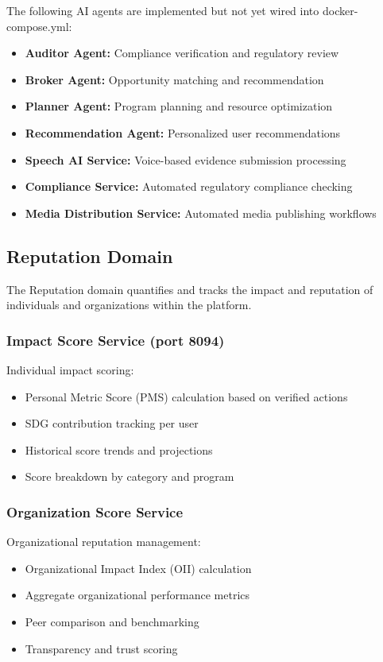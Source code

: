 The following AI agents are implemented but not yet wired into docker-compose.yml:
\begin{itemize}
  \item \textbf{Auditor Agent:} Compliance verification and regulatory review
  \item \textbf{Broker Agent:} Opportunity matching and recommendation
  \item \textbf{Planner Agent:} Program planning and resource optimization
  \item \textbf{Recommendation Agent:} Personalized user recommendations
  \item \textbf{Speech AI Service:} Voice-based evidence submission processing
  \item \textbf{Compliance Service:} Automated regulatory compliance checking
  \item \textbf{Media Distribution Service:} Automated media publishing workflows
\end{itemize}

\subsection{Reputation Domain}

The Reputation domain quantifies and tracks the impact and reputation of individuals and organizations within the platform.

\subsubsection{Impact Score Service (port 8094)}

Individual impact scoring:
\begin{itemize}
  \item Personal Metric Score (PMS) calculation based on verified actions
  \item SDG contribution tracking per user
  \item Historical score trends and projections
  \item Score breakdown by category and program
\end{itemize}

\subsubsection{Organization Score Service}

Organizational reputation management:
\begin{itemize}
  \item Organizational Impact Index (OII) calculation
  \item Aggregate organizational performance metrics
  \item Peer comparison and benchmarking
  \item Transparency and trust scoring
\end{itemize}


